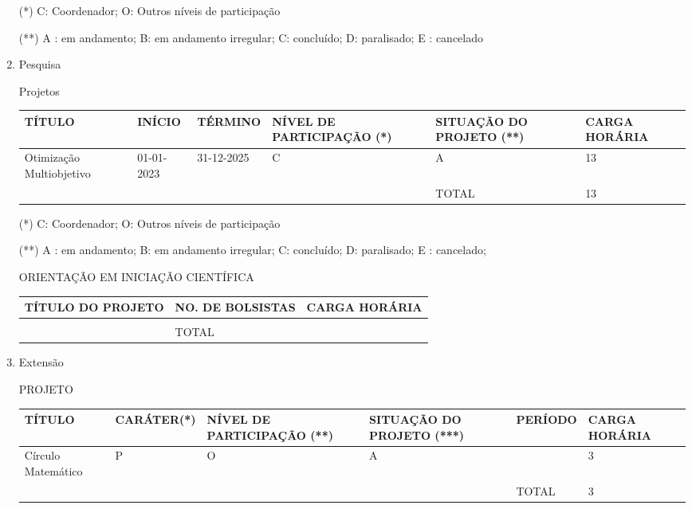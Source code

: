 \documentclass[a4paper]{article}
\begin{document}
\begin{enumerate}
	(*)  C: Coordenador; O: Outros níveis de participação

	(**) A : em andamento; B: em andamento irregular; C:  concluído;  D: paralisado; E :  cancelado

	\item Pesquisa
	
	\subitem Projetos

		\begin{tabular}{|p{2.0cm}|p{0.9cm}|p{1.2cm}|p{3cm}|p{4cm}|p{2.4cm}|}
			\hline
		TÍTULO						&  INÍCIO		& TÉRMINO					&	NÍVEL DE PARTICIPAÇÃO (*)	&  SITUAÇÃO DO PROJETO (**)	&CARGA HORÁRIA  		\\ \hline \hline
		Otimização Multiobjetivo	& 01-01-2023  & 31-12-2025					&\hfil		C				   	&\hfil  		A			&\hfil 			13			\\	\hline
		\multicolumn{4}{c|}{}																					& TOTAL   					&\hfil  		13			\\ \cline{5-6}
		\end{tabular}

		(*)  C: Coordenador; O: Outros níveis de participação

		(**) A : em andamento; B: em andamento irregular; C:  concluído;  D: paralisado; E :  cancelado;  

	\subitem ORIENTAÇÃO EM INICIAÇÃO CIENTÍFICA

	\begin{tabular}{|p{5.7cm}|p{5cm}|p{4cm}|}
		\hline
		TÍTULO DO PROJETO			 &  NO. DE BOLSISTAS    &\hfil CARGA HORÁRIA  \\ \hline \hline
										&  				    & 				\\	\hline
		\multicolumn{1}{c|}{}		 & TOTAL 	  			&  				\\ \cline{2-3}
	\end{tabular}

	\item Extensão

	\subitem PROJETO

		\begin{tabular}{|p{2.0cm}|p{1.9cm}|p{2.2cm}|p{3cm}|p{2cm}|p{2.4cm}|}
			\hline
			TÍTULO		 			&  CARÁTER(*)    & NÍVEL  DE PARTICIPAÇÃO (**)	&	SITUAÇÃO DO  PROJETO (***)	&  PERÍODO	&CARGA HORÁRIA		\\	\hline \hline
			Círculo Matemático	 	& \hfil  P  	 &	\hfil		O				&			\hfil A				& \hfil		&\hfil 3			\\	\hline
			\multicolumn{4}{c|}{}		 				   															& TOTAL 	&\hfil 3			\\	\cline{5-6}
		\end{tabular}


\end{enumerate}
\end{document}

